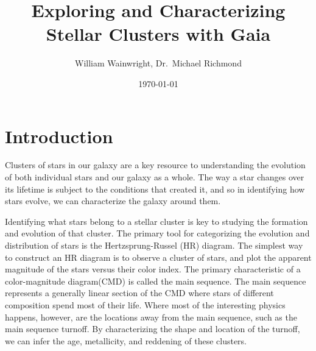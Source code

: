 \documentclass[aps,prb,twocolumn,groupedaddress,nofootinbib,floatfix]{revtex4-1}
\begin{document}
%
\title{Exploring and Characterizing Stellar Clusters with Gaia}

%
\author{William Wainwright, Dr.\ Michael Richmond}


\date{\today}

\begin{abstract} 
\end{abstract}

\maketitle

\section*{Introduction}
Clusters of stars in our galaxy are a key resource to understanding the evolution of both individual stars and our galaxy as a whole. The way a star changes over its lifetime is subject to the conditions that created it, and so in identifying how stars evolve, we can characterize the galaxy around them.

Identifying what stars belong to a stellar cluster is key to studying the formation and evolution of that cluster. The primary tool for categorizing the evolution and distribution of stars is the Hertzsprung-Russel (HR) diagram. The simplest way to construct an HR diagram is to observe a cluster of stars, and plot the apparent magnitude of the stars versus their color index. The primary characteristic of a color-magnitude diagram(CMD) is called the main sequence. The main sequence represents a generally linear section of the CMD where stars of different composition spend most of their life. Where most of the interesting physics happens, however, are the locations away from the main sequence, such as the main sequence turnoff. By characterizing the shape and location of the turnoff, we can infer the age, metallicity, and reddening of these clusters.
\end{document}

